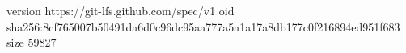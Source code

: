 version https://git-lfs.github.com/spec/v1
oid sha256:8cf765007b50491da6d0c96dc95aa777a5a1a17a8db177c0f216894ed951f683
size 59827

